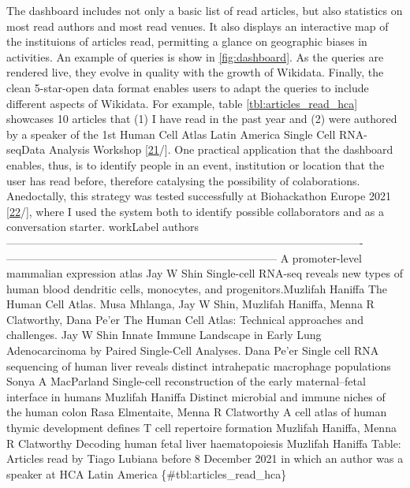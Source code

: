 The dashboard includes not only a basic list of read articles, but also statistics on most read authors and most read venues.
It also displays an interactive map of the instituions of articles read, permitting a glance on geographic biases in activities.
An example of queries is show in \ref{fig:dashboard}.
As the queries are rendered live, they evolve in quality with the growth of Wikidata.
Finally, the clean 5-star-open data format enables users to adapt the queries to include different aspects of Wikidata.
For example, table \ref{tbl:articles_read_hca} showcases 10 articles that (1) I have read in the past year and (2) were authored by a speaker of the 1st Human Cell Atlas Latin America Single Cell RNA-seqData Analysis Workshop {[}\protect\hyperlink{ref-1hag8XE6}{21}/{]}.
One practical application that the dashboard enables, thus, is to identify people in an event, institution or location that the user has read before, therefore catalysing the possibility of colaborations.
Anedoctally, this strategy was tested successfully at Biohackathon Europe 2021 {[}\protect\hyperlink{ref-kHL3NVxk}{22}/{]}, where I used the system both to identify possible collaborators and as a conversation starter.
\textbar workLabel \textbar authors \textbar{}
\textbar-------------------------------------------------------------------------------------------------\textbar--------------------------------------------------------------------------\textbar{}
\textbar A promoter-level mammalian expression atlas \textbar Jay W Shin \textbar{}
\textbar Single-cell RNA-seq reveals new types of human blood dendritic cells, monocytes, and progenitors.\textbar Muzlifah Haniffa \textbar{}
\textbar The Human Cell Atlas. \textbar Musa Mhlanga, Jay W Shin, Muzlifah Haniffa, Menna R Clatworthy, Dana Pe'er\textbar{}
\textbar The Human Cell Atlas: Technical approaches and challenges. \textbar Jay W Shin \textbar{}
\textbar Innate Immune Landscape in Early Lung Adenocarcinoma by Paired Single-Cell Analyses. \textbar Dana Pe'er \textbar{}
\textbar Single cell RNA sequencing of human liver reveals distinct intrahepatic macrophage populations \textbar Sonya A MacParland \textbar{}
\textbar Single-cell reconstruction of the early maternal--fetal interface in humans \textbar Muzlifah Haniffa \textbar{}
\textbar Distinct microbial and immune niches of the human colon \textbar Rasa Elmentaite, Menna R Clatworthy \textbar{}
\textbar A cell atlas of human thymic development defines T cell repertoire formation \textbar Muzlifah Haniffa, Menna R Clatworthy \textbar{}
\textbar Decoding human fetal liver haematopoiesis \textbar Muzlifah Haniffa \textbar{}
Table: Articles read by Tiago Lubiana before 8 December 2021 in which an author was a speaker at HCA Latin America
\{\#tbl:articles\_read\_hca\} \textbar{}


